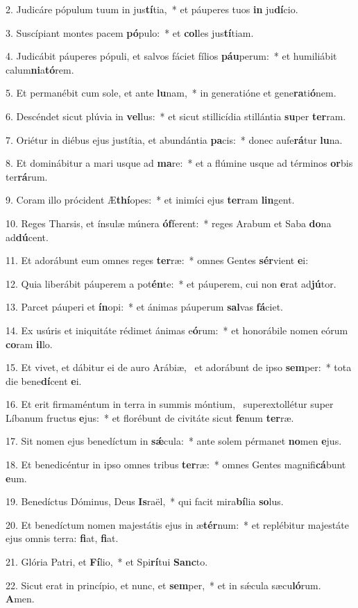 2. Judicáre pópulum tuum in jus\textbf{tí}tia,~*  et páuperes tuos \textbf{in} ju\textbf{dí}cio.\

3. Suscípiant montes pacem \textbf{pó}pulo:~*  et \textbf{col}les jus\textbf{tí}tiam.\

4. Judicábit páuperes pópuli, et salvos fáciet fílios \textbf{páu}perum:~*  et humiliábit calum\textbf{ni}a\textbf{tó}rem.\

5. Et permanébit cum sole, et ante \textbf{lu}nam,~*  in generatióne et gene\textbf{ra}ti\textbf{ó}nem.\

6. Descéndet sicut plúvia in \textbf{vel}lus:~*  et sicut stillicídia stillántia \textbf{su}per \textbf{ter}ram.\

7. Oriétur in diébus ejus justítia, et abundántia \textbf{pa}cis:~*  donec aufe\textbf{rá}tur \textbf{lu}na.\

8. Et dominábitur a mari usque ad \textbf{ma}re:~*  et a flúmine usque ad términos \textbf{or}bis ter\textbf{rá}rum.\

9. Coram illo prócident Æ\textbf{thí}opes:~*  et inimíci ejus \textbf{ter}ram \textbf{lin}gent.\

10. Reges Tharsis, et ínsulæ múnera \textbf{óf}ferent:~*  reges Arabum et Saba \textbf{do}na ad\textbf{dú}cent.\

11. Et adorábunt eum omnes reges \textbf{ter}ræ:~*  omnes Gentes \textbf{sér}vient \textbf{e}i:\

12. Quia liberábit páuperem a pot\textbf{én}te:~*  et páuperem, cui non \textbf{e}rat ad\textbf{jú}tor.\

13. Parcet páuperi et \textbf{ín}opi:~*  et ánimas páuperum \textbf{sal}vas \textbf{fá}ciet.\

14. Ex usúris et iniquitáte rédimet ánimas e\textbf{ó}rum:~*  et honorábile nomen eórum \textbf{co}ram \textbf{il}lo.\

15. Et vivet, et dábitur ei de auro Arábiæ, \dag\  et adorábunt de ipso \textbf{sem}per:~*  tota die bene\textbf{dí}cent \textbf{e}i.\

16. Et erit firmaméntum in terra in summis móntium, \dag\  superextollétur super Líbanum fructus \textbf{e}jus:~*  et florébunt de civitáte sicut \textbf{fe}num \textbf{ter}ræ.\

17. Sit nomen ejus benedíctum in \textbf{sǽ}cula:~*  ante solem pérmanet \textbf{no}men \textbf{e}jus.\

18. Et benedicéntur in ipso omnes tribus \textbf{ter}ræ:~*  omnes Gentes magnifi\textbf{cá}bunt \textbf{e}um.\

19. Benedíctus Dóminus, Deus \textbf{Is}raël,~*  qui facit mira\textbf{bí}lia \textbf{so}lus.\

20. Et benedíctum nomen majestátis ejus in æ\textbf{tér}num:~*  et replébitur majestáte ejus omnis terra: \textbf{fi}at, \textbf{fi}at.\

21. Glória Patri, et \textbf{Fí}lio,~*  et Spi\textbf{rí}tui \textbf{Sanc}to.\

22. Sicut erat in princípio, et nunc, et \textbf{sem}per,~*  et in sǽcula sæcu\textbf{ló}rum. \textbf{A}men.\

